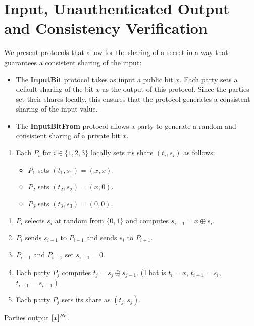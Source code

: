 \section{Input, Unauthenticated Output and Consistency Verification}

We present protocols that allow for the sharing of a secret in a way that guarantees a consistent sharing of the input:
\begin{itemize}
    \item The {\bf InputBit} protocol takes as input a public bit $x$. 
    Each party sets a default sharing of the bit $x$ as the output of this protocol.
    Since the parties set their shares locally, this ensures that the protocol generates a consistent sharing of the input value.
    \item The {\bf InputBitFrom} protocol allows a party to generate a random and consistent sharing of a private bit $x$. 
\end{itemize}

\begin{protocol}
    \begin{enumerate}
        \item Each $P_i$ for $i \in \{1, 2, 3\}$ locally sets its share $(t_i, s_i)$ as follows:
        \begin{itemize}
            \item $P_1$ sets $(t_1, s_1) = (x, x)$.
            \item $P_2$ sets $(t_2, s_2) = (x, 0)$.
            \item $P_3$ sets $(t_3, s_3) = (0, 0)$.
        \end{itemize}
    \end{enumerate}
\end{protocol}

\begin{protocol}
    \begin{enumerate}
	\item $P_i$ selects $s_i$ at random from $\{0, 1\}$ and computes $s_{i-1} = x \oplus s_i$.
	\item $P_i$ sends $s_{i-1}$ to $P_{i-1}$ and sends $s_i$ to $P_{i+1}$.
	\item $P_{i-1}$ and $P_{i+1}$ set $s_{i+1} = 0$.
	\item Each party $P_j$ computes $t_j = s_j \oplus s_{j-1}$.
		(That is $t_i = x$, $t_{i+1} = s_{i}$, $t_{i-1} = s_{i-1}$.)
	\item Each party $P_j$ sets its share as $(t_j, s_j)$.
    \end{enumerate}
    Parties output $[x]^{Bb}$.
\end{protocol}

